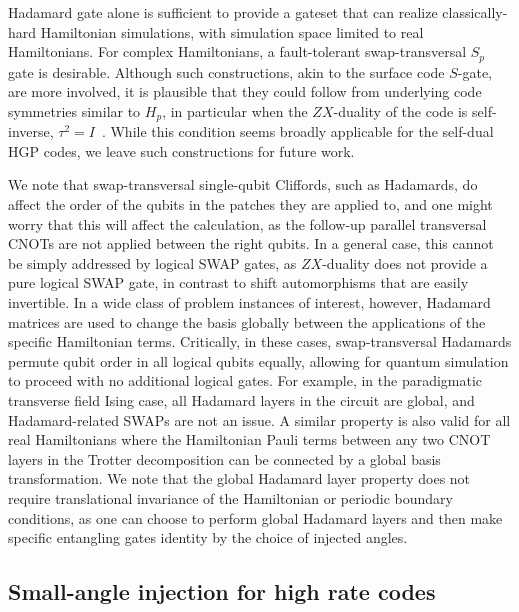 \documentclass[aps, prx, reprint, superscriptaddress, longbibliography, floatfix]{revtex4-2}
\begin{document}
Hadamard gate alone is sufficient to provide a gateset that can realize classically-hard Hamiltonian simulations, with simulation space limited to real Hamiltonians. For complex Hamiltonians, a fault-tolerant swap-transversal $S_p$ gate is desirable. Although such constructions, akin to the surface code $S$-gate, are more involved, it is plausible that they could follow from underlying code symmetries similar to $H_p$, in particular when the $ZX$-duality of the code is self-inverse, $\tau^2=I$~\cite{Breuckmann2024}. While this condition seems broadly applicable for the self-dual HGP codes, we leave such constructions for future work.

We note that swap-transversal single-qubit Cliffords, such as Hadamards, do affect the order of the qubits in the patches they are applied to, and one might worry that this will affect the calculation, as the follow-up parallel transversal CNOTs are not applied between the right qubits. In a general case, this cannot be simply addressed by logical SWAP gates, as $ZX$-duality does not provide a pure logical SWAP gate, in contrast to shift automorphisms that are easily invertible. In a wide class of problem instances of interest, however, Hadamard matrices are used to change the basis globally between the applications of the specific Hamiltonian terms. Critically, in these cases, swap-transversal Hadamards permute qubit order in all logical qubits equally, allowing for quantum simulation to proceed with no additional logical gates. For example, in the paradigmatic transverse field Ising case, all Hadamard layers in the circuit are global, and Hadamard-related SWAPs are not an issue. A similar property is also valid for all real Hamiltonians where the Hamiltonian Pauli terms between any two CNOT layers in the Trotter decomposition can be connected by a global basis transformation. We note that the global Hadamard layer property does not require translational invariance of the Hamiltonian or periodic boundary conditions, as one can choose to perform global Hadamard layers and then make specific entangling gates identity by the choice of injected angles. 

\subsection{Small-angle injection for high rate codes}
\label{sec:qldpc_injection}
\end{document}
